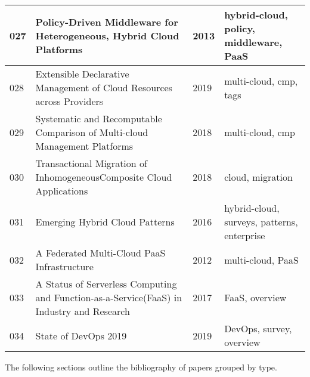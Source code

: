 \documentclass[11pt,a4paper]{article}
\begin{document}
\begin{longtable}{L{0.6cm}L{7.5cm}L{0.9cm}L{4cm}}
        027 & Policy-Driven Middleware for Heterogeneous, Hybrid Cloud Platforms\cite{coll:027} & 2013 & hybrid-cloud, policy, middleware, PaaS \\  & Extensible Declarative Management of Cloud Resources across Providers\cite{coll:028} & 2019 & multi-cloud, cmp, tags \\  & Systematic and Recomputable Comparison of Multi-cloud Management Platforms\cite{coll:029} & 2018 & multi-cloud, cmp \\  & Transactional Migration of InhomogeneousComposite Cloud Applications\cite{coll:030} & 2018 & cloud, migration \\  & Emerging Hybrid Cloud Patterns\cite{coll:031} & 2016 & hybrid-cloud, surveys, patterns, enterprise \\  & A Federated Multi-Cloud PaaS Infrastructure\cite{coll:032} & 2012 & multi-cloud, PaaS \\  & A Status of Serverless Computing and Function-as-a-Service(FaaS) in Industry and Research\cite{coll:033} & 2017 & FaaS, overview \\  & State of DevOps 2019\cite{coll:034} & 2019 & DevOps, survey, overview \\ \midrule
        \bottomrule
    \end{longtable}

    The following sections outline the bibliography of papers grouped by type.

    \printbibliography[heading=subbibliography,title={Books},type=book]
    \printbibliography[heading=subbibliography,title={Articles},type=article]
    \printbibliography[heading=subbibliography,title={Inbooks},type=inbook]
    \printbibliography[heading=subbibliography,title={Inproceedings},type=inproceedings]
    \printbibliography[heading=subbibliography,title={Reports},type=report]
\end{document}
